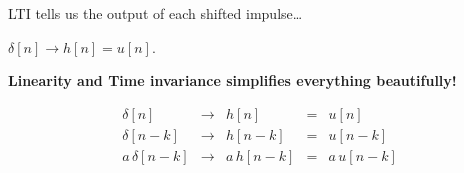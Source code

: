\documentclass[aspectratio=169,11pt]{beamer}
\newcommand{\CardTitleSize}{\large}
\newcommand{\CardTitle}[1]{%
  \vspace{0.15cm}
  {\CardTitleSize\bfseries #1}\par
}
\begin{document}
\begin{frame}{LTI tells us the output of each shifted impulse\ldots}

\begin{BlueBox}[
  calloutshadedblue,
  fontupper=\large,
  halign=center
]{}
\(
\delta[n]\longrightarrow h[n]=u[n].
\)
\end{BlueBox}

\vspace{0.12cm}

\begin{center}
\begin{GreenCard}[
  width=0.98\textwidth,
  halign=center,
  top=10pt,
  bottom=10pt
]
\CardTitle{Linearity and Time invariance simplifies everything beautifully!}

\vspace{0.06cm}

{\Large
\[
\begin{array}{rclcl}
\delta[n] &\longrightarrow& h[n] &=& u[n]\\[6pt]
\delta[n-k] &\longrightarrow& h[n-k] &=& u[n-k]\\[6pt]
a\,\delta[n-k] &\longrightarrow& a\,h[n-k] &=& a\,u[n-k]
\end{array}
\]
}



\end{GreenCard}
\end{center}

\end{frame}
\end{document}
